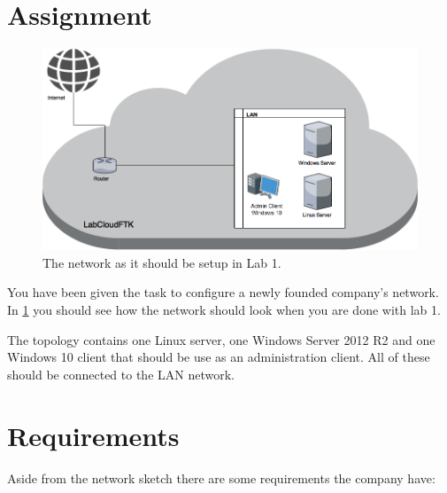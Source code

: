 \documentclass[paper=a4, fontsize=11pt]{report} %
\begin{document}
\section{Assignment}
\begin{figure}[h]
\centering
\includegraphics[width=1\linewidth]{./Lab01-Network}
\caption[Figure over network in Lab 1]{The network as it should be setup in Lab 1.}
\label{fig:network}
\end{figure}
You have been given the task to configure a newly founded company's network. In \figurename \ref{fig:network} you should see how the network should look when you are done with lab 1.

The topology contains one Linux server, one Windows Server 2012 R2 and one Windows 10 client that should be use as an administration client. All of these should be connected to the LAN network. 

\pagebreak

\section{Requirements}
\label{tasks}
Aside from the network sketch there are some requirements the company have:
\end{document}
